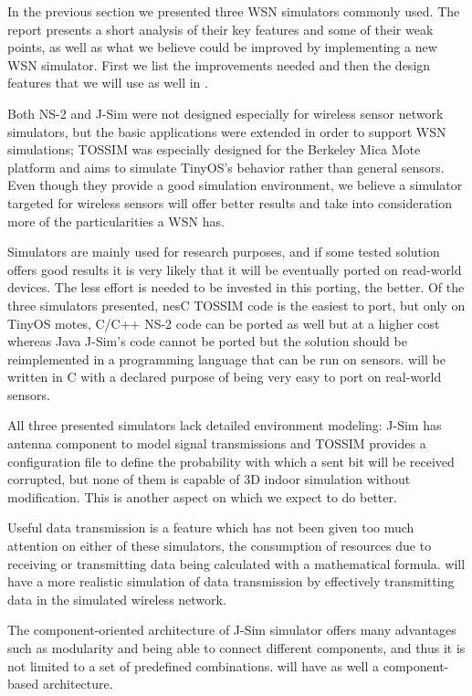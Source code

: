 In the previous section we presented three WSN simulators commonly used.
The report presents a short analysis of their key features and some of their 
weak points, as well as what we believe could be improved by implementing a 
new WSN simulator.
First we list the improvements needed and then the 
design features that we will use as well in \codename. 

Both NS-2 and J-Sim were not designed especially for wireless 
sensor network simulators, but the basic applications were extended
in order to support WSN simulations; TOSSIM was especially designed
for the Berkeley Mica Mote platform and aims to simulate TinyOS's behavior rather
than general sensors. Even though they provide a good simulation environment,
we believe a simulator targeted for wireless sensors will offer better results
and take into consideration more of the particularities a WSN has.

Simulators are mainly used for research purposes, and if some tested solution
offers good results it is very likely that it will be eventually ported on 
read-world devices. The less effort is needed to be invested in this porting, the
better. Of the three simulators presented, nesC TOSSIM code is the easiest to port,
but only on TinyOS motes, C/C++ NS-2 code can be ported as well but at a higher
cost whereas Java J-Sim's code cannot be ported but the solution should be 
reimplemented in a programming language that can be run on sensors.
\codename will be written in C with a declared purpose of being very easy to port
on real-world sensors.

All three presented simulators lack detailed environment modeling: J-Sim has 
antenna component to model signal transmissions and TOSSIM provides a configuration
file to define the probability with which a sent bit will be received corrupted, but 
none of them is capable of 3D indoor simulation without modification. 
This is another aspect on which we expect \codename to do better. 

Useful data transmission is a feature which has not been given too much 
attention on either of these simulators, the consumption of resources due to
receiving or transmitting data being calculated with a mathematical formula.
 \codename will have a more realistic simulation of data transmission by effectively
transmitting data in the simulated wireless network.

The component-oriented architecture of J-Sim simulator offers many advantages
such as modularity and being able to connect different components, and thus it is not limited
to a set of predefined combinations. \codename will have as well a component-based
architecture.

